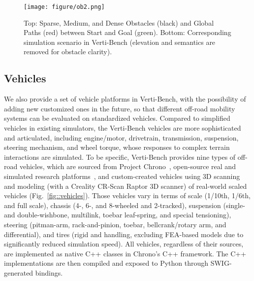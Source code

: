 \begin{figure}[ht]
    \centering
    \texttt{[image: figure/ob2.png]}
    \caption{Top: Sparse, Medium, and Dense Obstacles (black) and Global Paths (red) between Start and Goal (green). Bottom: Corresponding simulation scenario in Verti-Bench (elevation and semantics are removed for obstacle clarity).}
    \label{fig::obstacles}
\end{figure}


\subsection{Vehicles}
We also provide a set of vehicle platforms in Verti-Bench, with the possibility of adding new customized ones in the future, so that different off-road mobility systems can be evaluated on standardized vehicles. Compared to simplified vehicles in existing simulators, the Verti-Bench vehicles are more sophisticated and articulated, including engine/motor, drivetrain, transmission, suspension, steering mechanism, and wheel torque, whose responses to complex terrain interactions are simulated. To be specific, Verti-Bench  provides nine types of off-road vehicles, which are sourced from Project Chrono~\cite{tasora2016chrono}, open-source real and simulated research platforms~\cite{elmquist2022art}, and custom-created vehicles using 3D scanning and modeling (with a Creality CR-Scan Raptor 3D scanner) of real-world scaled vehicles (Fig.~\ref{fig::vehicles}). Those vehicles vary in terms of scale (1/10th, 1/6th, and full scale), chassis (4-, 6-, and 8-wheeled and 2-tracked), suspension (single- and double-wishbone, multilink, toebar leaf-spring, and special tensioning), steering (pitman-arm, rack-and-pinion, toebar, bellcrank/rotary arm,
and differential), and tires (rigid and handling, excluding FEA-based models due to significantly reduced simulation speed). All vehicles, regardless of their sources, are implemented as native C++ classes in Chrono's C++ framework. The C++ implementations are then compiled and exposed to Python through SWIG-generated bindings.  


